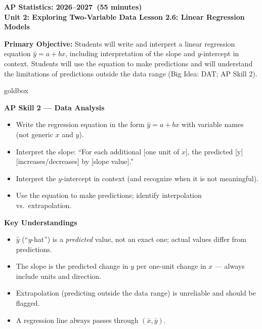 \documentclass[10pt]{article}
\newcommand{\CourseName}{AP Statistics}
\newcommand{\SchoolYear}{2026--2027}
\newcommand{\MeetingLength}{55 minutes}
\newcommand{\UnitNumberName}{Unit 2: Exploring Two-Variable Data \quad}
\newcommand{\LessonNumberName}{Lesson 2.6: Linear Regression Models}
\begin{document}
\begin{center}
    {\Large\bfseries \CourseName: \SchoolYear\ (\MeetingLength) \\
    {\small\bfseries \UnitNumberName \LessonNumberName}}
\end{center}

\begin{tcolorbox}[colback=sky,colframe=navy,boxrule=0.9pt,arc=2mm,
    left=2mm,right=2mm,top=1.5mm,bottom=1.5mm]
    \textbf{Primary Objective:} Students will write and interpret a linear regression equation
    $\hat{y} = a + bx$, including interpretation of the slope and $y$-intercept in context.
    Students will use the equation to make predictions and will understand the limitations of
    predictions outside the data range (Big Idea: DAT; AP Skill 2).
\end{tcolorbox}

\begin{skillbox}{goldbox}
\begin{minipage}[t]{0.48\linewidth}
    \textbf{AP Skill 2 --- Data Analysis}
    \begin{itemize}
        \item Write the regression equation in the form $\hat{y} = a + bx$ with variable names (not generic $x$ and $y$).
        \item Interpret the slope: ``For each additional [one unit of $x$], the predicted [y] [increases/decreases] by [slope value].''
        \item Interpret the $y$-intercept in context (and recognize when it is not meaningful).
        \item Use the equation to make predictions; identify interpolation vs.\ extrapolation.
    \end{itemize}
\end{minipage}
\hfill
\begin{minipage}[t]{0.48\linewidth}
    \textbf{Key Understandings}
    \begin{itemize}
        \item $\hat{y}$ (``$y$-hat'') is a \textit{predicted} value, not an exact one; actual values differ from predictions.
        \item The slope is the predicted change in $y$ per one-unit change in $x$ --- always include units and direction.
        \item Extrapolation (predicting outside the data range) is unreliable and should be flagged.
        \item A regression line always passes through $(\bar{x}, \bar{y})$.
    \end{itemize}
\end{minipage}
\end{skillbox}
\end{document}
